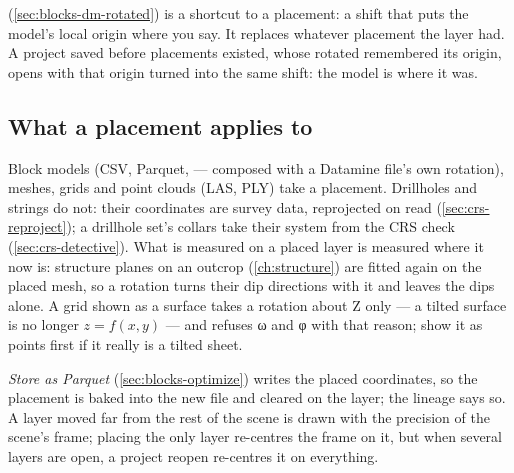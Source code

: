  (\cref{sec:blocks-dm-rotated}) is a shortcut to a placement: a
shift that puts the model's local origin where you say. It replaces whatever placement the layer had. A
project saved before placements existed, whose rotated  remembered its origin, opens with that
origin turned into the same shift: the model is where it was.

\subsection{What a placement applies to}

Block models (CSV, Parquet,  — composed with a Datamine file's own rotation), meshes, grids
and point clouds (LAS, PLY) take a placement. Drillholes and strings do not: their coordinates are survey
data, reprojected on read (\cref{sec:crs-reproject}); a drillhole set's collars take their system from
the CRS check (\cref{sec:crs-detective}). What is measured on a placed layer is measured where it now
is: structure planes on an outcrop (\cref{ch:structure}) are fitted again on the placed mesh, so a
rotation turns their dip directions with it and leaves the dips alone. A grid shown as a surface takes a rotation about Z
only — a tilted surface is no longer $z = f(x, y)$ — and refuses ω and φ with that reason; show it as
points first if it really is a tilted sheet.

\begin{caution}
\emph{Store as Parquet} (\cref{sec:blocks-optimize}) writes the placed coordinates, so the placement is
baked into the new file and cleared on the layer; the lineage says so. A layer moved far from the rest of
the scene is drawn with the precision of the scene's frame; placing the only layer re-centres the frame
on it, but when several layers are open, a project reopen re-centres it on everything.
\end{caution}

